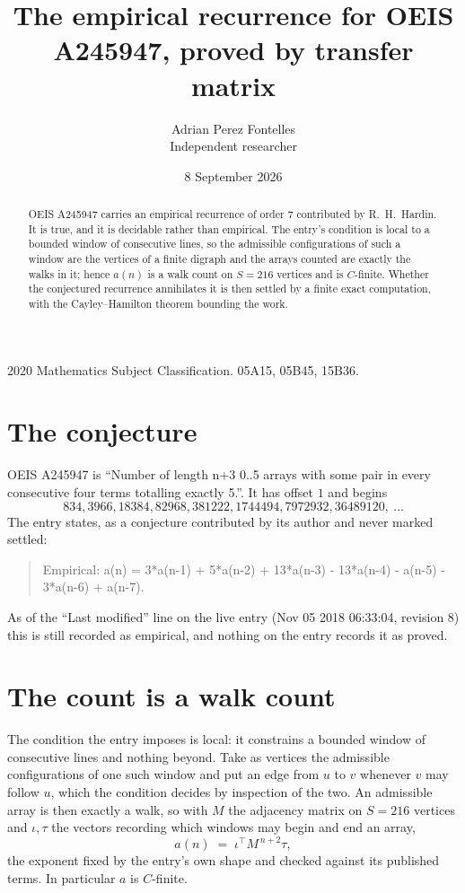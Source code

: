 \documentclass[11pt,a4paper]{article}
\title{The empirical recurrence for OEIS A245947, proved by transfer matrix}
\author{Adrian Perez Fontelles\\ \small Independent researcher}
\date{8 September 2026}
\theoremstyle{plain}
\theoremstyle{definition}
\begin{document}
\maketitle

\begin{abstract}
OEIS A245947 carries an empirical recurrence of order $7$ contributed by R.~H.~Hardin. It is
true, and it is decidable rather than empirical. The entry's condition is local to a bounded window of consecutive lines, so
the admissible configurations of such a window are the vertices of a finite digraph and the
arrays counted are exactly the walks in it; hence $a(n)$ is a walk count on $S=216$ vertices
and is $C$-finite. Whether the conjectured recurrence annihilates it is then settled by a
finite exact computation, with the Cayley--Hamilton theorem bounding the work.
\end{abstract}

\noindent\small 2020 Mathematics Subject Classification. 05A15, 05B45, 15B36.\normalsize

\section{The conjecture}

OEIS A245947 is ``Number of length n+3 0..5 arrays with some pair in every consecutive four terms totalling exactly 5.''. It has offset $1$ and begins
\[
834, 3966, 18384, 82968, 381222, 1744494, 7972932, 36489120,\ \dots
\]
The entry states, as a conjecture contributed by its author and never marked settled:
\begin{quote}
Empirical: a(n) = 3*a(n-1) + 5*a(n-2) + 13*a(n-3) - 13*a(n-4) - a(n-5) - 3*a(n-6) + a(n-7).
\end{quote}
As of the ``Last modified'' line on the live entry (Nov 05 2018 06:33:04, revision 8) this is still
recorded as empirical, and nothing on the entry records it as proved.

\section{The count is a walk count}

The condition the entry imposes is local: it constrains a bounded window of consecutive lines and nothing beyond. Take as
vertices the admissible configurations of one such window and put an edge from $u$ to $v$
whenever $v$ may follow $u$, which the condition decides by inspection of the two. An
admissible array is then exactly a walk, so with $M$ the adjacency matrix on $S=216$ vertices
and $\iota,\tau$ the vectors recording which windows may begin and end an array,
\[
a(n)\;=\;\iota^{\!\top}M^{\,n+2}\tau ,
\]
the exponent fixed by the entry's own shape and checked against its published terms. In
particular $a$ is $C$-finite.
\end{document}
